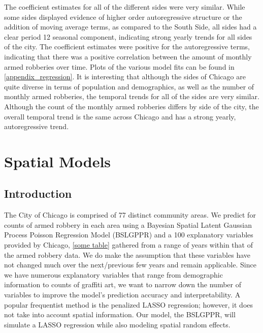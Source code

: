 \documentclass{article} %
\begin{document}
\noindent The coefficient estimates for all of the different sides were very similar.  While some sides displayed evidence of higher order autoregressive structure or the addition of moving average terms, as compared to the South Side, all sides had a clear period 12 seasonal component, indicating strong yearly trends for all sides of the city.  The coefficient estimates were positive for the autoregressive terms, indicating that there was a positive correlation between the amount of monthly armed robberies over time.  Plots of the various model fits can be found in \autoref{appendix_regression}.  It is interesting that although the sides of Chicago are quite diverse in terms of population and demographics, as well as the number of monthly armed robberies, the temporal trends for all of the sides are very similar.  Although the count of the monthly armed robberies differs by side of the city, the overall temporal trend is the same across Chicago and has a strong yearly, autoregressive trend.\newline   


\section{Spatial Models}


\subsection{Introduction}

The City of Chicago is comprised of 77 distinct community areas. We predict for counts of armed robbery in each area using a Bayesian Spatial Latent Gaussian Process Poisson Regression Model (BSLGPPR) and a 100 explanatory variables provided by Chicago, \autoref{some table} gathered from a range of years within that of the armed robbery data. We do make the assumption that these variables have not changed much over the next/previous few years and remain applicable. Since we have numerous explanatory variables that range from demographic information to counts of graffiti art, we want to narrow down the number of variables to improve the model's prediction accuracy and interpretability.  A popular frequentist method is the penalized LASSO regression; however, it does not take into account spatial information. Our model, the BSLGPPR, will simulate a LASSO regression while also modeling spatial random effects. 
\end{document}
